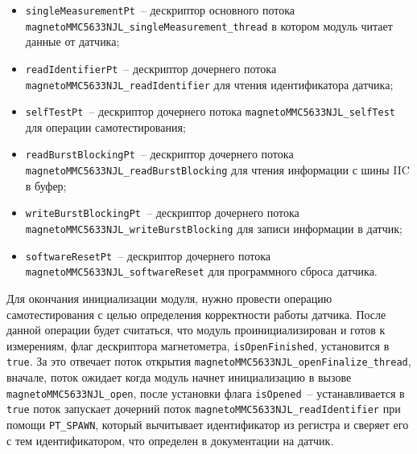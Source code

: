 \begin{itemize}
    \item \lstinline{singleMeasurementPt}~-- дескриптор основного потока \lstinline{magnetoMMC5633NJL_singleMeasurement_thread} в котором модуль читает данные от датчика;
    \item \lstinline{readIdentifierPt}~-- дескриптор дочернего потока \lstinline{magnetoMMC5633NJL_readIdentifier} для чтения идентификатора датчика;
    \item \lstinline{selfTestPt}~--  дескриптор дочернего потока \lstinline{magnetoMMC5633NJL_selfTest} для операции самотестирования;
    \item \lstinline{readBurstBlockingPt}~--  дескриптор дочернего потока \lstinline{magnetoMMC5633NJL_readBurstBlocking} для чтения информации с шины IIC в буфер;
    \item \lstinline{writeBurstBlockingPt}~--  дескриптор дочернего потока \lstinline{magnetoMMC5633NJL_writeBurstBlocking} для записи информации в датчик;
    \item \lstinline{softwareResetPt}~--  дескриптор дочернего потока \lstinline{magnetoMMC5633NJL_softwareReset} для программного сброса датчика.
\end{itemize}

Для окончания инициализации модуля, нужно провести операцию самотестирования с целью определения корректности работы датчика. После данной операции
будет считаться, что модуль проинициализирован и готов к измерениям, флаг дескриптора магнетометра, \lstinline{isOpenFinished}, установится в \lstinline{true}.
За это отвечает поток открытия \lstinline{magnetoMMC5633NJL_openFinalize_thread}, вначале, поток ожидает когда модуль начнет инициализацию в вызове \lstinline{magnetoMMC5633NJL_open},
после установки флага \lstinline{isOpened}~-- устанавливается в \lstinline{true} поток запускает дочерний поток \lstinline{magnetoMMC5633NJL_readIdentifier} 
при помощи \lstinline{PT_SPAWN}, который вычитывает идентификатор из регистра и сверяет его с тем идентификатором, что определен в документации на датчик.

